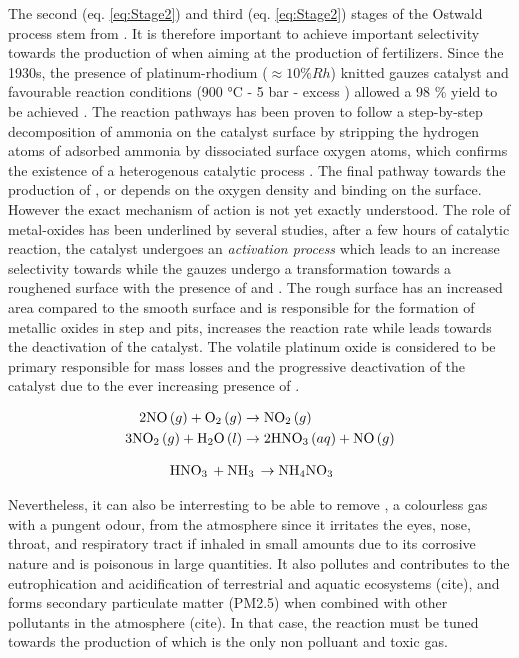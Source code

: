 The second (eq. \ref{eq:Stage2}) and third (eq. \ref{eq:Stage2}) stages of the Ostwald process stem from \nitricoxide.
It is therefore important to achieve important selectivity towards the production of \nitricoxide when aiming at the production of fertilizers.
Since the 1930s, the presence of platinum-rhodium ($\approx 10 \% Rh$) knitted gauzes catalyst and favourable reaction conditions (900 °C - 5 bar - excess \dioxygen) allowed a 98 \% yield to be achieved \parencite{Handforth1934, Heck1982}.
The reaction pathways has been proven to follow a step-by-step decomposition of ammonia on the catalyst surface by stripping the hydrogen atoms of adsorbed ammonia by dissociated surface oxygen atoms, which confirms the existence of a heterogenous catalytic process \parencite{Bradley1995,PEREZRAMIREZ2004}.
The final pathway towards the production of \nitrogen, \nitrousoxide or \nitricoxide depends on the oxygen density and binding on the surface.
However the exact mechanism of action is not yet exactly understood.
The role of metal-oxides has been underlined by several studies, after a few hours of catalytic reaction, the catalyst undergoes an \textit{activation process} which leads to an increase selectivity towards \nitricoxide while the gauzes undergo a transformation towards a roughened surface with the presence of  and .
The rough surface has an increased area compared to the smooth surface and is responsible for the formation of metallic oxides in step and pits,  increases the reaction rate while  leads towards the deactivation of the catalyst.
The volatile platinum oxide is considered to be primary responsible for mass losses and the progressive deactivation of the catalyst due to the ever increasing presence of  \parencite{McCabe1986}.


\begin{align}
    \label{eq:Stage2}
    2 \nitricoxide (g) + \dioxygen (g) & \rightarrow \nitrogendioxide (g) \\
    3 \nitrogendioxide (g) + \water (l) & \rightarrow 2\nitricacid (aq) + \nitricoxide (g)
\end{align}

\begin{align}
    \label{eq:Stage3}
    \nitricacid + \ammonia & \rightarrow \ammoniumnitrate
\end{align}

Nevertheless, it can also be interresting to be able to remove \ammonia, a colourless gas with a pungent odour, from the atmosphere since it irritates the eyes, nose, throat, and respiratory tract if inhaled in small amounts due to its corrosive nature and is poisonous in large quantities.
It also pollutes and contributes to the eutrophication and acidification of terrestrial and aquatic ecosystems (cite), and forms secondary particulate matter (PM2.5) when combined with other pollutants in the atmosphere (cite).
In that case, the reaction must be tuned towards the production of \nitrogen which is the only non polluant and toxic gas.

